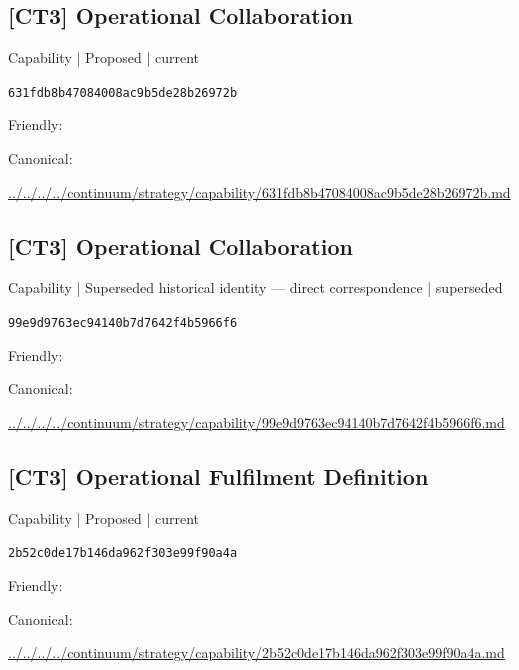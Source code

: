 \documentclass[10pt,a4paper]{article}
\begin{document}
\subsection*{[CT3] Operational Collaboration}
{\small Capability | Proposed | current}\par
\texttt{631fdb8b47084008ac9b5de28b26972b}\par
Friendly: \par
Canonical: \par
{\footnotesize\url{../../../../continuum/strategy/capability/631fdb8b47084008ac9b5de28b26972b.md}}\par
\subsection*{[CT3] Operational Collaboration}
{\small Capability | Superseded historical identity — direct correspondence | superseded}\par
\texttt{99e9d9763ec94140b7d7642f4b5966f6}\par
Friendly: \par
Canonical: \par
{\footnotesize\url{../../../../continuum/strategy/capability/99e9d9763ec94140b7d7642f4b5966f6.md}}\par
\subsection*{[CT3] Operational Fulfilment Definition}
{\small Capability | Proposed | current}\par
\texttt{2b52c0de17b146da962f303e99f90a4a}\par
Friendly: \par
Canonical: \par
{\footnotesize\url{../../../../continuum/strategy/capability/2b52c0de17b146da962f303e99f90a4a.md}}\par
\end{document}
